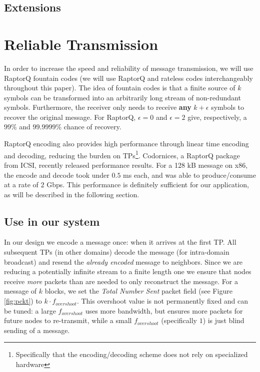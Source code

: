 \subsection{Extensions}


\section{Reliable Transmission}\label{reliable}
In order to increase the speed and reliability of message transmission, we will use RaptorQ fountain codes (we will use RaptorQ and rateless codes interchangeably throughout this paper). The idea of fountain codes is that a finite source of $k$ symbols can be transformed into an arbitrarily long stream of non-redundant symbols. Furthermore, the receiver only needs to receive \textbf{any} $k + \epsilon$ symbols to recover the original message. For RaptorQ, $\epsilon = 0$ and $\epsilon = 2$ give, respectively, a $99\%$ and $99.9999\%$ chance of recovery.\cite{raptorq, raptorqpresent}

RaptorQ encoding also provides high performance through linear time encoding and decoding, reducing the burden on TPs\footnote{Specifically that the encoding/decoding scheme does not rely on specialized hardware}. Codornices, a RaptorQ package from ICSI, recently released performance results. For a 128 kB message on x86, the encode and decode took under $0.5$ ms each, and was able to produce/consume at a rate of $2$ Gbps\cite{raptorqperf}. This performance is definitely sufficient for our application, as will be described in the following section.

\subsection{Use in our system}
In our design we encode a message once: when it arrives at the first TP. All subsequent TPs (in other domains) decode the message (for intra-domain broadcast) and resend the \textit{already encoded} message to neighbors. Since we are reducing a potentially infinite stream to a finite length one we ensure that nodes receive \textit{more} packets than are needed to only reconstruct the message. For a message of $k$ blocks, we set the \textit{Total Number Sent} packet field (see Figure \ref{fig:pckt}) to $k\cdot f_{overshoot}$. This overshoot value is not permanently fixed and can be tuned: a large $f_{overshoot}$ uses more bandwidth, but ensures more packets for future nodes to re-transmit, while a small $f_{overshoot}$ (specifically $1$) is just blind sending of a message.

